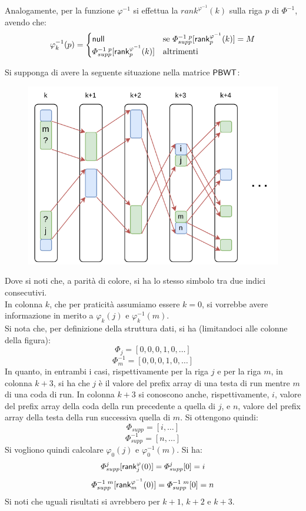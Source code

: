 Analogamente, per la funzione $\varphi^{-1}$ si effettua la
$rank^{\varphi^{-1}}(k)$ 
sulla riga $p$ di $\varPhi^{-1}$, avendo che:
\[\varphi_k^{-1}(p)=
  \begin{cases}
    \mbox{\rm {\sf null}}&\mbox{se }\varPhi^{-1\,\,p}_{supp}[\mbox{\rm {\sf rank}}^{\varphi^{-1}}_p(k)]=M\\
    \varPhi^{-1\,\,p}_{supp}[\mbox{\rm {\sf rank}}^{\varphi^{-1}}_p(k)]&\mbox{altrimenti }
  \end{cases}
\]
\begin{esempio}
  Si supponga di avere la seguente situazione nella matrice $\mbox{\rm {\sf PBWT}}$:
  \begin{figure}[H]
    \centering
    \includegraphics[scale = 0.8]{img/phi.pdf}   
  \end{figure}
  Dove si noti che, a parità di colore, si ha lo stesso simbolo tra due indici
  consecutivi. \\
  In colonna $k$, che per praticità assumiamo essere $k=0$, si vorrebbe avere
  informazione in merito a $\varphi_k(j)$ e $\varphi^{-1}_k(m)$. \\
  Si nota che, per definizione della struttura dati, si ha (limitandoci alle
  colonne della figura):
  \[\varPhi_j=[0,0,0,1,0, \ldots]\]
  \[\varPhi^{-1}_m=[0,0,0,1,0,\ldots]\]
  In quanto, in entrambi i casi, rispettivamente per la riga $j$ e per la riga
  $m$, 
  in colonna $k+3$, si ha che $j$ è il valore del prefix array di una testa di
  run 
  mentre $m$ di una coda di run. In colonna $k+3$ si conoscono anche,
  rispettivamente, $i$, valore del prefix array della coda della run precedente
  a quella di $j$, e $n$, valore del prefix array della testa della run
  successiva quella di $m$. Si ottengono quindi:
  \[\varPhi_{supp}=[i,\ldots]\]
  \[\varPhi^{-1}_{supp}=[n,\ldots]\]
  Si vogliono quindi calcolare $\varphi_0(j)$ e  $\varphi^{-1}_0(m)$. Si ha:
  \[\varPhi_{supp}^j[\mbox{\rm {\sf rank}}^\varphi_j(0)]=\varPhi_{supp}^j[0]=i\]
  \[\varPhi^{-1\,\,m}_{supp}[\mbox{\rm {\sf rank}}^{\varphi^{-1}}_m(0)]=\varPhi^{-1\,\,m}_{supp}[0]=n\]
  Si noti che uguali risultati si avrebbero per $k+1$, $k+2$ e $k+3$.
\end{esempio}
